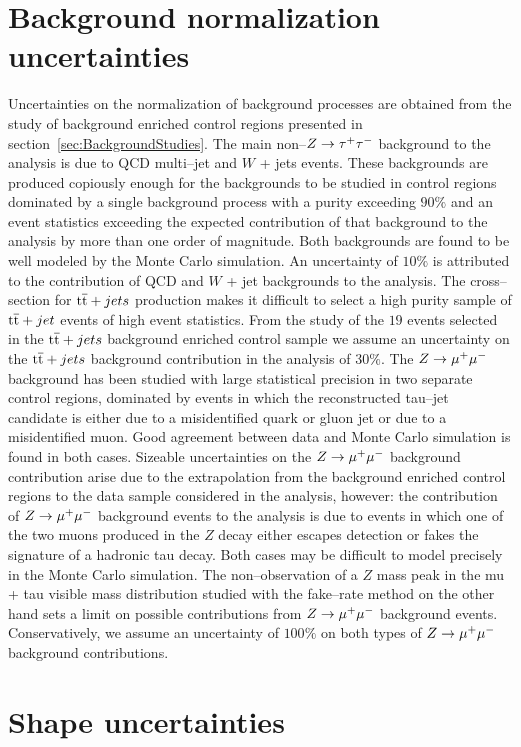 \section{Background normalization uncertainties}

Uncertainties on the normalization of background processes are obtained from the
study of background enriched control regions presented in
section~\ref{sec:BackgroundStudies}.  The main non--$Z \to \tau^+\tau^-$ background to
the analysis is due to QCD multi--jet and $W$ + jets events.  These backgrounds
are produced copiously enough for the backgrounds to be studied in control
regions dominated by a single background process with a purity exceeding $90\%$
and an event statistics exceeding the expected contribution of that background
to the analysis by more than one order of magnitude.  Both backgrounds are found
to be well modeled by the Monte Carlo simulation.  An uncertainty of $10\%$ is
attributed to the contribution of QCD and $W$ + jet backgrounds to the analysis.
The cross--section for $\mathrm{t}\overline{\mathrm{t}} + jets$ production makes it difficult to select a
high purity sample of $\mathrm{t}\overline{\mathrm{t}} + jet$ events of high event statistics.  From the
study of the $19$ events selected in the $\mathrm{t}\overline{\mathrm{t}} + jets$ background enriched
control sample we assume an uncertainty on the $\mathrm{t}\overline{\mathrm{t}} + jets$ background
contribution in the analysis of $30\%$.  The $Z \to \mu^+\mu^-$ background has been
studied with large statistical precision in two separate control regions,
dominated by events in which the reconstructed tau--jet candidate is either due
to a misidentified quark or gluon jet or due to a misidentified muon.  Good
agreement between data and Monte Carlo simulation is found in both cases.
Sizeable uncertainties on the $Z \to \mu^+\mu^-$ background contribution arise due to
the extrapolation from the background enriched control regions to the data
sample considered in the analysis, however: the contribution of $Z \to \mu^+\mu^-$
background events to the analysis is due to events in which one of the two muons
produced in the $Z$ decay either escapes detection or fakes the signature of a
hadronic tau decay.  Both cases may be difficult to model precisely in the Monte
Carlo simulation.  The non--observation of a $Z$ mass peak in the mu + tau
visible mass distribution studied with the fake--rate method on the other hand
sets a limit on possible contributions from $Z \to \mu^+\mu^-$ background events.
Conservatively, we assume an uncertainty of $100\%$ on both types of $Z \to \mu^+\mu^-$
background contributions.


\section{Shape uncertainties}

